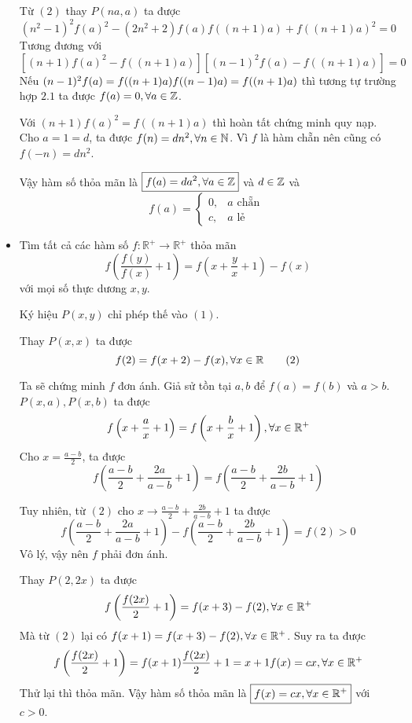 \documentclass[11pt]{scrartcl}
\begin{document}
\begin{itemize}[label=, leftmargin=0em, itemsep=0.5em]
\begin{sol}
        Từ $(2)$ thay $P(na,a)$ ta được
        \[
            (n^2 - 1)^2f(a)^2 - (2n^2 + 2)f(a)f((n + 1)a) + f((n + 1)a)^2 = 0
        \]
        Tương đương với 
        \[
            [(n + 1)f(a)^2 -f((n + 1)a) ][(n - 1)^2f(a) - f((n + 1)a)] = 0
        \]
        Nếu $(n - 1)^2f(a) = f((n + 1)a) \lra f((n - 1)a) = f((n + 1)a)$ thì tương tự trường hợp $2.1$ ta được $f(a) = 0, \forall a \in \mathbb{Z}$.

        Với $(n + 1)f(a)^2 = f((n + 1)a)$ thì hoàn tất chứng minh quy nạp. Cho $a = 1 = d$, ta được $f(n) = dn^2,\forall n \in \mathbb{N}$. Vì $f$ là hàm chẵn nên cũng có $f(-n) = dn^2$. 

        Vậy hàm số thỏa mãn là $\boxed{f(a) = da^2, \forall a \in \mathbb{Z}}$ và $d \in \mathbb{Z}$ và \[\boxed{ f(a)=
        \left\{\begin{array}{rr}0,&a \text{ chẵn }\\
            c,&a \text{ lẻ }
        \end{array}
        \right.
        }
        \]
    \end{sol}
    
    
    \item \begin{bt}
        Tìm tất cả các hàm số $f: \mathbb{R}^+\rightarrow \mathbb{R}^+$ thỏa mãn
        \[f\left(\frac{f(y)}{f(x)}+1\right)=f\left(x+\frac{y}{x}+1\right)-f(x)\]
        với mọi số thực dương $x,y$.
    \end{bt}
    \begin{sol}
        Ký hiệu $P(x,y)$ chỉ phép thế vào $(1)$.

        Thay $P(x,x)$ ta được \[f(2) = f(x + 2) - f(x), \forall x\in \mathbb{R} \tag{2}\]

        Ta sẽ chứng minh $f$ đơn ánh. Giả sử tồn tại $a,b$ để $f(a) = f(b)$ và $a > b$. $P(x,a), P(x,b)$ ta được 
        \[
            f\left(x + \frac{a}{x} + 1\right) = f\left(x + \frac{b}{x} + 1\right), \xro
        \]
        Cho $x = \frac{a - b}{2}$, ta được 
        \[
            f\left(\frac{a - b}{2} + \frac{2a}{a - b} + 1\right) = f\left(\frac{a - b}{2} + \frac{2b}{a - b} + 1\right)
        \]

        Tuy nhiên, từ $(2)$ cho $x \to \frac{a - b}{2} + \frac{2b}{a - b} + 1$ ta được
        \[
        f\left(\frac{a - b}{2} + \frac{2a}{a - b} + 1\right) - f\left(\frac{a - b}{2} + \frac{2b}{a - b} + 1\right) = f(2) > 0
        \]
        Vô lý, vậy nên $f$ phải đơn ánh.

        Thay $P(2,2x)$ ta được 
        \[
            f\left(\frac{f(2x)}{2} + 1\right) = f(x + 3) - f(2), \xro
        \]
        Mà từ $(2)$ lại có $f(x + 1 ) = f(x + 3) -f(2) ,\forall x\in \mathbb{R^+}$. Suy ra ta được
        \[
            f\left(\frac{f(2x)}{2} + 1\right) = f(x + 1 ) \ra \frac{f(2x)}{2} + 1 = x + 1  \ra f(x) =cx, \xro
        \]
        Thử lại thì thỏa mãn. Vậy hàm số thỏa mãn là $\boxed{f(x) =cx, \forall x\in \mathbb{R^+}}$ với $c > 0$.
    \end{sol}
    

\end{itemize}
\end{document}
